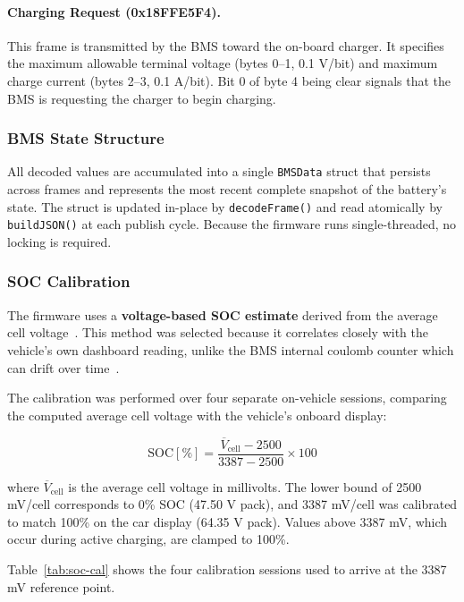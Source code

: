 \paragraph{Charging Request (0x18FFE5F4).}
This frame is transmitted by the BMS toward the on-board charger. It specifies the maximum allowable terminal voltage (bytes 0--1, 0.1 V/bit) and maximum charge current (bytes 2--3, 0.1 A/bit). Bit 0 of byte 4 being clear signals that the BMS is requesting the charger to begin charging.

\subsubsection{BMS State Structure}

All decoded values are accumulated into a single \texttt{BMSData} struct that persists across frames and represents the most recent complete snapshot of the battery's state. The struct is updated in-place by \texttt{decodeFrame()} and read atomically by \texttt{buildJSON()} at each publish cycle. Because the firmware runs single-threaded, no locking is required.

\subsubsection{SOC Calibration}
\label{sec:soc-cal}

The firmware uses a \textbf{voltage-based SOC estimate} derived from the average cell voltage~\cite{lifepo4soc}. This method was selected because it correlates closely with the vehicle's own dashboard reading, unlike the BMS internal coulomb counter which can drift over time~\cite{bmssoc}.

The calibration was performed over four separate on-vehicle sessions, comparing the computed average cell voltage with the vehicle's onboard display:

\begin{equation}
    \label{eq:soc}
    \text{SOC} [\%] = \frac{\overline{V}_{\text{cell}} - 2500}{3387 - 2500} \times 100
\end{equation}

where $\overline{V}_{\text{cell}}$ is the average cell voltage in millivolts. The lower bound of 2500 mV/cell corresponds to 0\% SOC (47.50 V pack), and 3387 mV/cell was calibrated to match 100\% on the car display (64.35 V pack). Values above 3387 mV, which occur during active charging, are clamped to 100\%.

Table~\ref{tab:soc-cal} shows the four calibration sessions used to arrive at the 3387 mV reference point.

